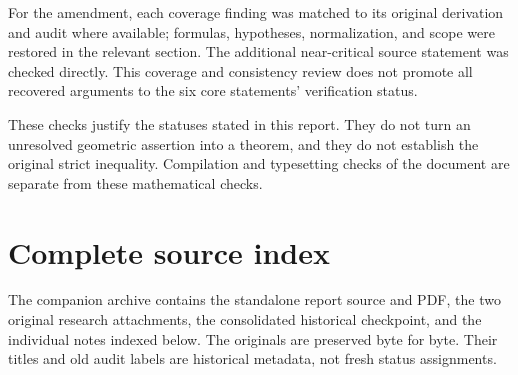 \documentclass[11pt,a4paper]{article}
\theoremstyle{definition}
\theoremstyle{remark}
\numberwithin{equation}{section}
\begin{document}
For the amendment, each coverage finding was matched to its original
derivation and audit where available; formulas, hypotheses, normalization,
and scope were restored in the relevant section. The additional
near-critical source statement was checked directly. This coverage and
consistency review does not promote all recovered arguments to the
six core statements' verification status.

These checks justify the statuses stated in this report. They do not turn
an unresolved geometric assertion into a theorem, and they do not establish
the original strict inequality. Compilation and typesetting checks of the
document are separate from these mathematical checks.


\appendix
\section{Complete source index}
\label{app:source-index}
The companion archive contains the standalone report source and PDF, the two original research attachments, the consolidated historical checkpoint, and the individual notes indexed below. The originals are preserved byte for byte. Their titles and old audit labels are historical metadata, not fresh status assignments.
\end{document}
